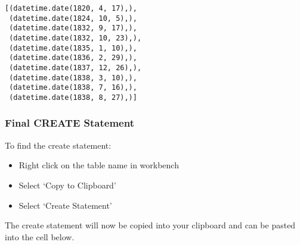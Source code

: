 \documentclass[11pt]{article}
\makeatletter
\providecommand{\tightlist}{%
      \setlength{\itemsep}{0pt}\setlength{\parskip}{0pt}}
\newcommand{\boxspacing}{\kern\kvtcb@left@rule\kern\kvtcb@boxsep}
\newcommand{\prompt}[4]{
        {\ttfamily\llap{{\color{#2}[#3]:\hspace{3pt}#4}}\vspace{-\baselineskip}}
    }
\makeatother
\begin{document}
            \begin{tcolorbox}[breakable, size=fbox, boxrule=.5pt, pad at break*=1mm, opacityfill=0]
\prompt{Out}{outcolor}{11}{\boxspacing}
\begin{Verbatim}[commandchars=\\\{\}]
[(datetime.date(1820, 4, 17),),
 (datetime.date(1824, 10, 5),),
 (datetime.date(1832, 9, 17),),
 (datetime.date(1832, 10, 23),),
 (datetime.date(1835, 1, 10),),
 (datetime.date(1836, 2, 29),),
 (datetime.date(1837, 12, 26),),
 (datetime.date(1838, 3, 10),),
 (datetime.date(1838, 7, 16),),
 (datetime.date(1838, 8, 27),)]
\end{Verbatim}
\end{tcolorbox}
        
    \hypertarget{final-create-statement}{%
\subsubsection{Final CREATE Statement}\label{final-create-statement}}

To find the create statement:

\begin{itemize}
\tightlist
\item
  Right click on the table name in workbench
\item
  Select `Copy to Clipboard'
\item
  Select `Create Statement'
\end{itemize}

The create statement will now be copied into your clipboard and can be
pasted into the cell below.
\end{document}
